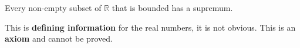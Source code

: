 \begin{proposition}
    Every non-empty subset of $\mathbb R$ that is bounded has a supremum. 
\end{proposition}

\begin{remark}
    This is \textbf{defining information} for the real numbers, it is not obvious. This is an \textbf{axiom} and cannot be proved.
\end{remark}

